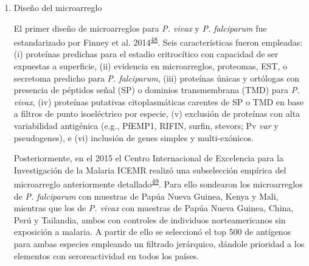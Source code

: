 \documentclass[a4paper]{article}
\begin{document}
\begin{enumerate}
\def\labelenumi{\alph{enumi}.}
\item
  Diseño del microarreglo

  El primer diseño de microarreglos para \emph{P. vivax} y \emph{P.
  falciparum} fue estandarizado por Finney et al.
  2014\textsuperscript{\protect\hyperlink{ref-Finney2014}{48}}. Seis
  características fueron empleadas: (i) proteínas predichas para el
  estadio eritrocítico con capacidad de ser expuestas a superficie, (ii)
  evidencia en microarreglos, proteomas, EST, o secretoma predicho para
  \emph{P. falciparum}, (iii) proteínas únicas y ortólogas con presencia
  de péptidos señal (SP) o dominios transmembrana (TMD) para \emph{P.
  vivax}, (iv) proteínas putativas citoplasmáticas carentes de SP o TMD
  en base a filtros de punto isoeléctrico por especie, (v) exclusión de
  proteínas con alta variabilidad antigénica (e.g., PfEMP1, RIFIN,
  surfin, stevors; Pv \emph{var} y pseudogenes), e (vi) inclusión de
  genes simples y multi-exónicos.

  Posteriormente, en el 2015 el Centro Internacional de Excelencia para
  la Investigación de la Malaria ICEMR realizó una subselección empírica
  del microarreglo anteriormente
  detallado\textsuperscript{\protect\hyperlink{ref-King2015FOC}{49}}.
  Para ello sondearon los microarreglos de \emph{P. falciparum} con
  muestras de Papúa Nueva Guinea, Kenya y Mali, mientras que los de
  \emph{P. vivax} con muestras de Papúa Nueva Guinea, China, Perú y
  Tailandia, ambos con controles de individuos norteamericanos sin
  exposición a malaria. A partir de ello se seleccionó el top 500 de
  antígenos para ambas especies empleando un filtrado jerárquico,
  dándole prioridad a los elementos con seroreactividad en todos los
  países. 
\end{enumerate}
\end{document}
